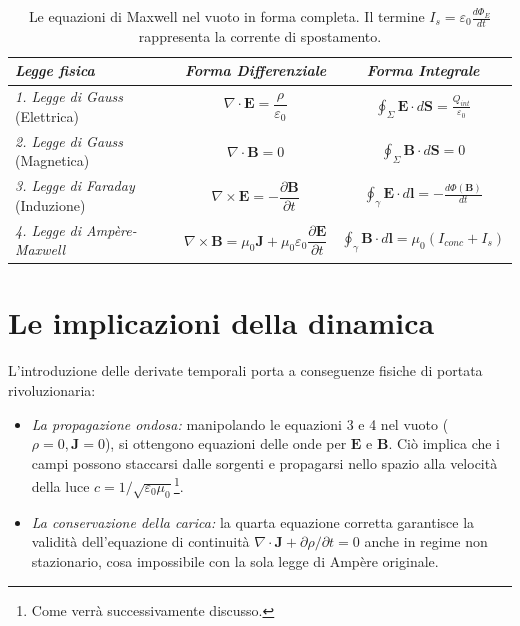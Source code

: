 \documentclass[a4paper,11pt]{report}
\begin{document}
\begin{table}[htbp]
    \centering
    \renewcommand{\arraystretch}{2.4}
    \begin{tabular}{p{4cm} c c}
        \hline
        \textit{Legge fisica} & \textit{Forma Differenziale} & \textit{Forma Integrale} \\
        \hline
        
        \textit{1. Legge di Gauss} \newline (Elettrica) & 
        $\nabla \cdot \bm{E} = \dfrac{\rho}{\varepsilon_0}$ & 
        $\displaystyle \oint_{\Sigma} \bm{E} \cdot d\bm{S} = \frac{Q_{int}}{\varepsilon_0}$ \\
        
        \textit{2. Legge di Gauss} \newline (Magnetica) & 
        $\nabla \cdot \bm{B} = 0$ & 
        $\displaystyle \oint_{\Sigma} \bm{B} \cdot d\bm{S} = 0$ \\
        
        \textit{3. Legge di Faraday} \newline (Induzione) & 
        $\nabla \times \bm{E} = -\dfrac{\partial \bm{B}}{\partial t}$ & 
        $\displaystyle \oint_{\gamma} \bm{E} \cdot d\bm{l} = - \frac{d\Phi(\bm{B})}{dt}$ \\
        
        \textit{4. Legge di Ampère-Maxwell} & 
        $\nabla \times \bm{B} = \mu_0 \bm{J} + \mu_0\varepsilon_0 \dfrac{\partial \bm{E}}{\partial t}$ & 
        $\displaystyle \oint_{\gamma} \bm{B} \cdot d\bm{l} = \mu_0 (I_{conc} + I_{s})$ \\
        \hline
    \end{tabular}
    \caption{Le equazioni di Maxwell nel vuoto in forma completa. Il termine $I_s = \varepsilon_0 \frac{d\Phi_E}{dt}$ rappresenta la corrente di spostamento.}
    \label{tab:maxwell_dinamiche}
\end{table}

\section{Le implicazioni della dinamica}
L'introduzione delle derivate temporali porta a conseguenze fisiche di portata rivoluzionaria:
\begin{itemize}
    \item \textit{La propagazione ondosa:} manipolando le equazioni 3 e 4 nel vuoto ($\rho=0, \bm{J}=0$), si ottengono equazioni delle onde per $\bm{E}$ e $\bm{B}$. Ciò implica che i campi possono staccarsi dalle sorgenti e propagarsi nello spazio alla velocità della luce $c = 1/\sqrt{\varepsilon_0\mu_0}$\footnote{Come verrà successivamente discusso.}.
    \item \textit{La conservazione della carica:} la quarta equazione corretta garantisce la validità dell'equazione di continuità $\nabla \cdot \bm{J} + \partial \rho / \partial t = 0$ anche in regime non stazionario, cosa impossibile con la sola legge di Ampère originale.
\end{itemize}
\end{document}
